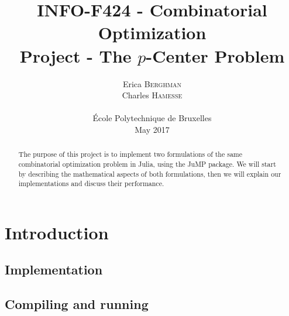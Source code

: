 \documentclass[a4paper,10pt]{article}
\title{INFO-F424 - Combinatorial Optimization\\Project - The $p$-Center Problem}
\date{\vspace{-3ex}
Erica \textsc{Berghman} \\
Charles \textsc{Hamesse} \\
~\\
École Polytechnique de Bruxelles\\
\vspace{6ex}May 2017\vspace{4ex}}
\begin{document}

\maketitle
\begin{abstract}
    The purpose of this project is to implement two formulations of the same combinatorial optimization problem in Julia, using the JuMP package. We will start by describing the mathematical aspects of both formulations, then we will explain our implementations and discuss their performance.\vspace{2ex}
\end{abstract}

\tableofcontents
\pagebreak



\section{Introduction}

\subsection{Implementation}

\subsection{Compiling and running}
 
\end{document}
